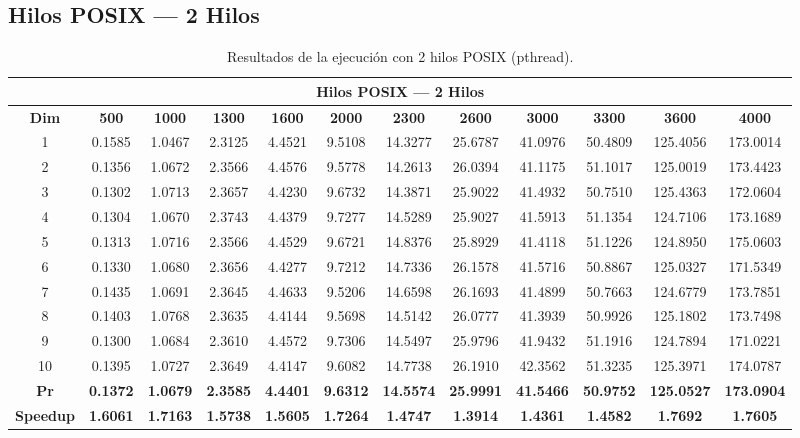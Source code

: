 \documentclass{article}
\begin{document}

\subsection{Hilos POSIX --- 2 Hilos}

\begin{table}[H]
\centering
\tiny
\begin{tabular}{|c|c|c|c|c|c|c|c|c|c|c|c|}
\hline
\multicolumn{12}{|c|}{\textbf{Hilos POSIX --- 2 Hilos}} \\
\hline
\textbf{Dim} & \textbf{500} & \textbf{1000} & \textbf{1300} & \textbf{1600} & \textbf{2000} & \textbf{2300} & \textbf{2600} & \textbf{3000} & \textbf{3300} & \textbf{3600} & \textbf{4000} \\
\hline
1  & 0.1585 & 1.0467 & 2.3125 & 4.4521 & 9.5108 & 14.3277 & 25.6787 & 41.0976 & 50.4809 & 125.4056 & 173.0014 \\
2  & 0.1356 & 1.0672 & 2.3566 & 4.4576 & 9.5778 & 14.2613 & 26.0394 & 41.1175 & 51.1017 & 125.0019 & 173.4423 \\
3  & 0.1302 & 1.0713 & 2.3657 & 4.4230 & 9.6732 & 14.3871 & 25.9022 & 41.4932 & 50.7510 & 125.4363 & 172.0604 \\
4  & 0.1304 & 1.0670 & 2.3743 & 4.4379 & 9.7277 & 14.5289 & 25.9027 & 41.5913 & 51.1354 & 124.7106 & 173.1689 \\
5  & 0.1313 & 1.0716 & 2.3566 & 4.4529 & 9.6721 & 14.8376 & 25.8929 & 41.4118 & 51.1226 & 124.8950 & 175.0603 \\
6  & 0.1330 & 1.0680 & 2.3656 & 4.4277 & 9.7212 & 14.7336 & 26.1578 & 41.5716 & 50.8867 & 125.0327 & 171.5349 \\
7  & 0.1435 & 1.0691 & 2.3645 & 4.4633 & 9.5206 & 14.6598 & 26.1693 & 41.4899 & 50.7663 & 124.6779 & 173.7851 \\
8  & 0.1403 & 1.0768 & 2.3635 & 4.4144 & 9.5698 & 14.5142 & 26.0777 & 41.3939 & 50.9926 & 125.1802 & 173.7498 \\
9  & 0.1300 & 1.0684 & 2.3610 & 4.4572 & 9.7306 & 14.5497 & 25.9796 & 41.9432 & 51.1916 & 124.7894 & 171.0221 \\
10 & 0.1395 & 1.0727 & 2.3649 & 4.4147 & 9.6082 & 14.7738 & 26.1910 & 42.3562 & 51.3235 & 125.3971 & 174.0787 \\
\hline
\textbf{Pr} & \textbf{0.1372} & \textbf{1.0679} & \textbf{2.3585} & \textbf{4.4401} & \textbf{9.6312} & \textbf{14.5574} & \textbf{25.9991} & \textbf{41.5466} & \textbf{50.9752} & \textbf{125.0527} & \textbf{173.0904} \\
\hline
\textbf{Speedup} & \textbf{1.6061} & \textbf{1.7163} & \textbf{1.5738} & \textbf{1.5605} & \textbf{1.7264} & \textbf{1.4747} & \textbf{1.3914} & \textbf{1.4361} & \textbf{1.4582} & \textbf{1.7692} & \textbf{1.7605} \\
\hline
\end{tabular}
\caption{Resultados de la ejecución con 2 hilos POSIX (pthread).}
\label{tab:t2}
\end{table}
\end{document}
